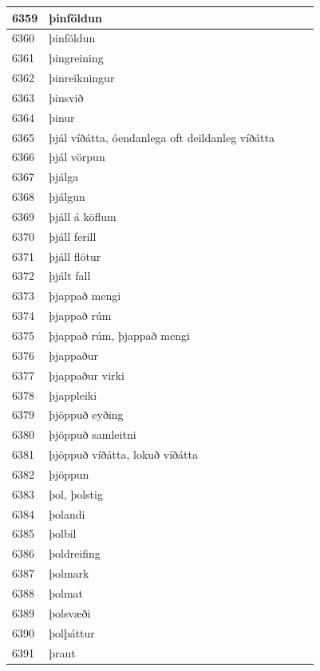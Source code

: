 \begin{longtable}{p{}|p{}|p{}|p{}|p{}}
\hline
6359 & þinföldun &  &  &  \\
\hline
6360 & þinföldun &  &  &  \\
\hline
6361 & þingreining &  &  &  \\
\hline
6362 & þinreikningur &  &  &  \\
\hline
6363 & þinsvið &  &  &  \\
\hline
6364 & þinur &  &  &  \\
\hline
6365 & þjál víðátta, óendanlega oft deildanleg víðátta &  &  &  \\
\hline
6366 & þjál vörpun &  &  &  \\
\hline
6367 & þjálga &  &  &  \\
\hline
6368 & þjálgun &  &  &  \\
\hline
6369 & þjáll á köflum &  &  &  \\
\hline
6370 & þjáll ferill &  &  &  \\
\hline
6371 & þjáll flötur &  &  &  \\
\hline
6372 & þjált fall &  &  &  \\
\hline
6373 & þjappað mengi &  &  &  \\
\hline
6374 & þjappað rúm &  &  &  \\
\hline
6375 & þjappað rúm, þjappað mengi &  &  &  \\
\hline
6376 & þjappaður &  &  &  \\
\hline
6377 & þjappaður virki &  &  &  \\
\hline
6378 & þjappleiki &  &  &  \\
\hline
6379 & þjöppuð eyðing &  &  &  \\
\hline
6380 & þjöppuð samleitni &  &  &  \\
\hline
6381 & þjöppuð víðátta, lokuð víðátta &  &  &  \\
\hline
6382 & þjöppun &  &  &  \\
\hline
6383 & þol, þolstig &  &  &  \\
\hline
6384 & þolandi &  &  &  \\
\hline
6385 & þolbil &  &  &  \\
\hline
6386 & þoldreifing &  &  &  \\
\hline
6387 & þolmark &  &  &  \\
\hline
6388 & þolmat &  &  &  \\
\hline
6389 & þolsvæði &  &  &  \\
\hline
6390 & þolþáttur &  &  &  \\
\hline
6391 & þraut &  &  &  \\

\end{longtable}
